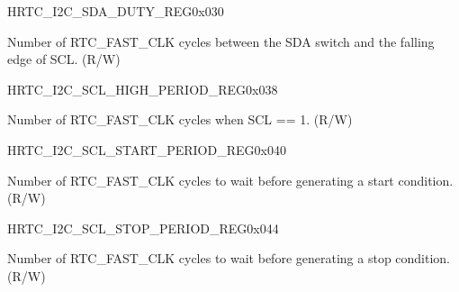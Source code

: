     
    \begin{register}{H}{RTC\_I2C\_SDA\_DUTY\_REG}{0x030}\label{regdesc:RTCI2CSDADUTYREG}
    \regnewline%
    \begin{regdesc}\begin{reglist}
    \item [RTC\_I2C\_SDA\_DUTY]Number of RTC\_FAST\_CLK cycles between the SDA switch and the falling edge of SCL. (R/W)
    \end{reglist}\end{regdesc}
    \end{register}
    
    
    \begin{register}{H}{RTC\_I2C\_SCL\_HIGH\_PERIOD\_REG}{0x038}\label{regdesc:RTCI2CSCLHIGHPERIODREG}
    \regnewline%
    \begin{regdesc}\begin{reglist}
    \item [RTC\_I2C\_SCL\_HIGH\_PERIOD]Number of RTC\_FAST\_CLK cycles when SCL == 1. (R/W)
    \end{reglist}\end{regdesc}
    \end{register}
    
    
    \begin{register}{H}{RTC\_I2C\_SCL\_START\_PERIOD\_REG}{0x040}\label{regdesc:RTCI2CSCLSTARTPERIODREG}
    \regnewline%
    \begin{regdesc}\begin{reglist}
    \item [RTC\_I2C\_SCL\_START\_PERIOD]Number of RTC\_FAST\_CLK cycles to wait before generating a start condition. (R/W)
    \end{reglist}\end{regdesc}
    \end{register}
    
    
    \begin{register}{H}{RTC\_I2C\_SCL\_STOP\_PERIOD\_REG}{0x044}\label{regdesc:RTCI2CSCLSTOPPERIODREG}
    \regnewline%
    \begin{regdesc}\begin{reglist}
    \item [RTC\_I2C\_SCL\_STOP\_PERIOD]Number of RTC\_FAST\_CLK cycles to wait before generating a stop condition. (R/W)
    \end{reglist}\end{regdesc}
    \end{register}
    
    
    
    